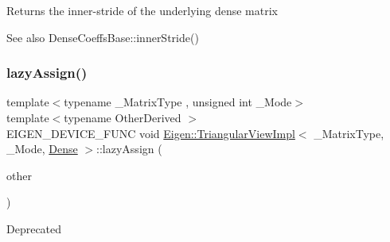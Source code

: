 \begin{DoxyReturn}{Returns}
the inner-\/stride of the underlying dense matrix 
\end{DoxyReturn}
\begin{DoxySeeAlso}{See also}
Dense\+Coeffs\+Base\+::inner\+Stride() 
\end{DoxySeeAlso}
\mbox{\label{class_eigen_1_1_triangular_view_impl_3_01___matrix_type_00_01___mode_00_01_dense_01_4_a5adecc3719d26f559b831161b8117646}} 
\subsubsection{\texorpdfstring{lazyAssign()}{lazyAssign()}\hspace{0.1cm}{\footnotesize\ttfamily [1/2]}}
{\footnotesize\ttfamily template$<$typename \+\_\+\+Matrix\+Type , unsigned int \+\_\+\+Mode$>$ \\
template$<$typename Other\+Derived $>$ \\
E\+I\+G\+E\+N\+\_\+\+D\+E\+V\+I\+C\+E\+\_\+\+F\+U\+NC void \mbox{\hyperlink{class_eigen_1_1_triangular_view_impl}{Eigen\+::\+Triangular\+View\+Impl}}$<$ \+\_\+\+Matrix\+Type, \+\_\+\+Mode, \mbox{\hyperlink{struct_eigen_1_1_dense}{Dense}} $>$\+::lazy\+Assign (\begin{DoxyParamCaption}\item[{const \mbox{\hyperlink{class_eigen_1_1_triangular_base}{Triangular\+Base}}$<$ Other\+Derived $>$ \&}]{other }\end{DoxyParamCaption})}

\begin{DoxyRefDesc}{Deprecated}
\item[\mbox{\hyperlink{deprecated__deprecated000009}{Deprecated}}]\end{DoxyRefDesc}
\mbox{\label{class_eigen_1_1_triangular_view_impl_3_01___matrix_type_00_01___mode_00_01_dense_01_4_ae39e43f20246e45cebf6cd2a32530c63}} 

